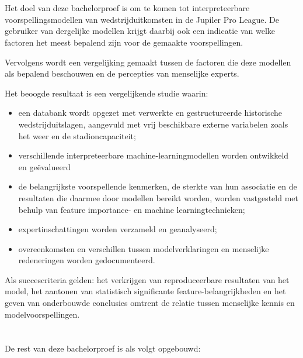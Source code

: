 \section{}%
\label{sec:onderzoeksdoelstelling}

Het doel van deze bachelorproef is om te komen tot interpreteerbare voorspellingsmodellen van wedstrijduitkomsten in de Jupiler Pro League. 
De gebruiker van dergelijke modellen krijgt daarbij ook een indicatie van welke factoren het meest bepalend zijn voor de gemaakte voorspellingen. 

Vervolgens wordt een vergelijking gemaakt tussen de factoren die deze modellen als bepalend beschouwen en de percepties van menselijke experts.

Het beoogde resultaat is een vergelijkende studie waarin:
\begin{itemize}
    \item een databank wordt opgezet met verwerkte en gestructureerde historische wedstrijduitslagen, aangevuld met vrij beschikbare externe variabelen zoals het weer en de stadioncapaciteit;
    \item verschillende interpreteerbare machine-learningmodellen worden ontwikkeld en geëvalueerd
    \item de belangrijkste voorspellende kenmerken, de sterkte van hun associatie en de resultaten die daarmee door modellen bereikt worden, worden vastgesteld met behulp van feature importance- en machine learningtechnieken;
    \item expertinschattingen worden verzameld en geanalyseerd;
    \item overeenkomsten en verschillen tussen modelverklaringen en menselijke redeneringen worden gedocumenteerd.
\end{itemize}

Als succescriteria gelden: het verkrijgen van reproduceerbare resultaten van het model, 
het aantonen van statistisch significante feature-belangrijkheden en het geven van onderbouwde conclusies 
omtrent de relatie tussen menselijke kennis en modelvoorspellingen.

\section{}%
\label{sec:opzet-bachelorproef}

De rest van deze bachelorproef is als volgt opgebouwd:

